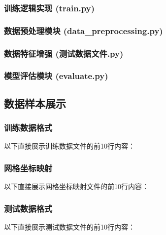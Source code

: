 \documentclass{article}
\begin{document}
\subsubsection{训练逻辑实现 (train.py)}


\subsubsection{数据预处理模块 (data\_preprocessing.py)}


\subsubsection{数据特征增强 (测试数据文件.py)}


\subsubsection{模型评估模块 (evaluate.py)}


\subsection{数据样本展示}
\subsubsection{训练数据格式}
以下直接展示训练数据文件的前10行内容：

\subsubsection{网格坐标映射}
以下直接展示网格坐标映射文件的前10行内容：

\subsubsection{测试数据格式}
以下直接展示测试数据文件的前10行内容：
\end{document}
